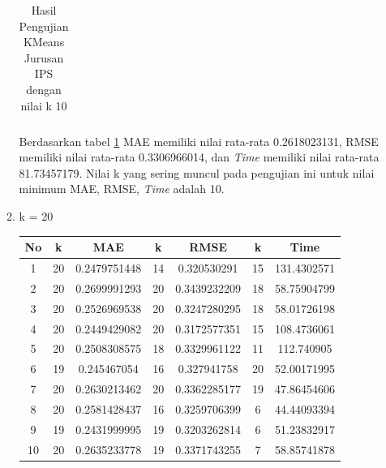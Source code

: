 \begin{enumerate}
\begin{enumerate}
\begin{longtable}[H]{|c|c|c|c|c|c|c|}
                        \caption{Hasil Pengujian KMeans Jurusan IPS dengan nilai k 10}
                        \label{tab:ips k = 10}
                    \end{longtable}
                \endgroup
                
                Berdasarkan tabel \ref{tab:ips k = 10} MAE memiliki nilai rata-rata 0.2618023131, RMSE memiliki nilai rata-rata 0.3306966014, dan \textit{Time} memiliki nilai rata-rata 81.73457179. Nilai k yang sering muncul pada pengujian ini untuk nilai minimum MAE, RMSE, \textit{Time} adalah 10.
                
                
            \item k = 20 \\
                \begingroup
                \renewcommand\arraystretch{1.5}
                    \begin{longtable}[H]{|c|c|c|c|c|c|c|}
                        \hline
                        No & k & MAE & k & RMSE & k & Time \\
                        \hline
                        1 & 20 & 0.2479751448 & 14 & 0.320530291 & 15 & 131.4302571\\
                        \hline
                        2 & 20 & 0.2699991293 & 20 & 0.3439232209 & 18 & 58.75904799\\
                        \hline
                        3 & 20 & 0.2526969538 & 20 & 0.3247280295 & 18 & 58.01726198\\
                        \hline
                        4 & 20 & 0.2449429082 & 20 & 0.3172577351 & 15 & 108.4736061\\
                        \hline
                        5 & 20 & 0.2508308575 & 18 & 0.3329961122 & 11 & 112.740905\\
                        \hline
                        6 & 19 & 0.245467054 & 16 & 0.327941758 & 20 & 52.00171995\\
                        \hline
                        7 & 20 & 0.2630213462 & 20 & 0.3362285177 & 19 & 47.86454606\\
                        \hline
                        8 & 20 & 0.2581428437 & 16 & 0.3259706399 & 6 & 44.44093394\\
                        \hline
                        9 & 19 & 0.2431999995 & 19 & 0.3203262814 & 6 & 51.23832917\\
                        \hline
                        10 & 20 & 0.2635233778 & 19 & 0.3371743255 & 7 & 58.85741878\\
                        \hline
                        

\end{longtable}
\end{enumerate}
\end{enumerate}
